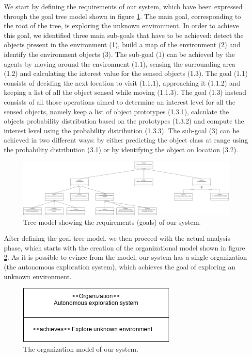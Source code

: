 \documentclass[a4paper, 10pt, conference]{ieeeconf}      %
\begin{document}
We start by defining the requirements of our system, which have been expressed through the goal tree model shown in figure \ref{fig:goal-tree-model}. The main goal, corresponding to the root of the tree, is exploring the unknown environment. In order to achieve this goal, we identified three main sub-goals that have to be achieved: detect the objects present in the environment (1), build a map of the environment (2) and identify the environment objects (3). The sub-goal (1) can be achieved by the agents by moving around the environment (1.1), sensing the surrounding area (1.2) and calculating the interest value for the sensed objects (1.3). The goal (1.1) consists of deciding the next location to visit (1.1.1), approaching it (1.1.2) and keeping a list of all the object sensed while moving (1.1.3). The goal (1.3) instead consists of all those operations aimed to determine an interest level for all the sensed objects, namely keep a list of object prototypes (1.3.1), calculate the objects probability distribution based on the prototypes (1.3.2) and compute the interest level using the probability distribution (1.3.3). The sub-goal (3) can be achieved in two different ways: by either predicting the object class at range using the probability distribution (3.1) or by identifying the object on location (3.2). 
\begin{figure}[htb]
	\centering
	\includegraphics[width=1\linewidth]{img/goal-tree.png}
	\caption{Tree model showing the requirements (goals) of our system.}
	\label{fig:goal-tree-model}
\end{figure}

After defining the goal tree model, we then proceed with the actual analysis phase, which starts with the creation of the organizational model shown in figure \ref{fig:organization-model}. As it is possible to evince from the model, our system has a single organization (the autonomous exploration system), which achieves the goal of exploring an unknown environment. 
\begin{figure}[htb]
	\centering
	\includegraphics[width=0.5\linewidth]{img/organization-model.png}
	\caption{The organization model of our system.}
	\label{fig:organization-model}
\end{figure}
\end{document}
